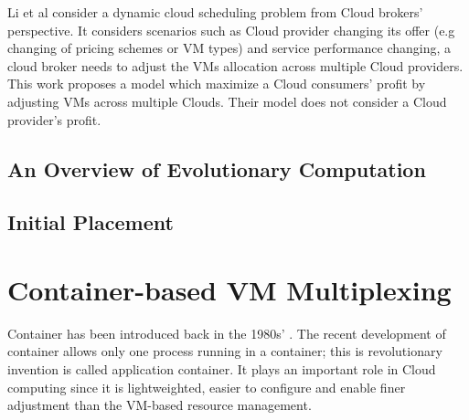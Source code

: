 Li et al \cite{Li:2011ti} consider a dynamic cloud scheduling problem 
from Cloud brokers' perspective. It considers scenarios such as Cloud provider changing its offer 
(e.g changing of pricing schemes or VM types) and service performance changing, 
a cloud broker needs to adjust the VMs allocation across multiple Cloud providers. 
This work proposes a model which maximize a Cloud consumers' profit by adjusting VMs across
multiple Clouds. Their model does not consider a Cloud provider's profit.






\subsection*{An Overview of Evolutionary Computation}


\subsection*{Initial Placement}

\section*{Container-based VM Multiplexing}
Container has been introduced back in the 1980s' \cite{}. The recent development of container
allows only one process running in a container; this is revolutionary invention is called application
container. It plays an important role in Cloud computing since it is lightweighted, easier to configure
and enable finer adjustment than the VM-based resource management.


